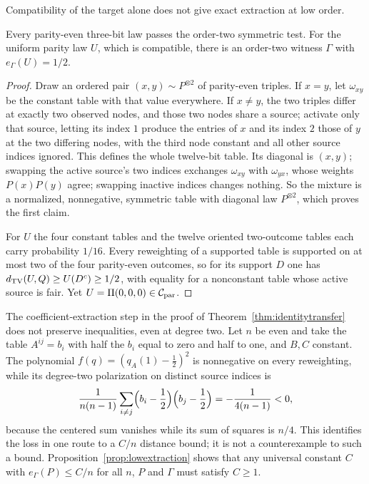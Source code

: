Compatibility of the target alone does not give exact extraction at low order.

\begin{proposition}\label{prop:lowextraction}
Every parity-even three-bit law passes the order-two symmetric test. For the uniform parity law $U$, which is compatible, there is an order-two witness $\Gamma$ with $e_\Gamma(U)=1/2$.
\end{proposition}

\begin{proof}
Draw an ordered pair $(x,y)\sim P^{\otimes2}$ of parity-even triples. If $x=y$, let $\omega_{xy}$ be the constant table with that value everywhere. If $x\ne y$, the two triples differ at exactly two observed nodes, and those two nodes share a source; activate only that source, letting its index $1$ produce the entries of $x$ and its index $2$ those of $y$ at the two differing nodes, with the third node constant and all other source indices ignored. This defines the whole twelve-bit table. Its diagonal is $(x,y)$; swapping the active source's two indices exchanges $\omega_{xy}$ with $\omega_{yx}$, whose weights $P(x)P(y)$ agree; swapping inactive indices changes nothing. So the mixture is a normalized, nonnegative, symmetric table with diagonal law $P^{\otimes2}$, which proves the first claim.

For $U$ the four constant tables and the twelve oriented two-outcome tables each carry probability $1/16$. Every reweighting of a supported table is supported on at most two of the four parity-even outcomes, so for its support $D$ one has $d_{\operatorname{TV}}(U,Q)\ge U(D^c)\ge1/2$, with equality for a nonconstant table whose active source is fair. Yet $U=\Pi(0,0,0)\in\mathcal C_{\mathrm{par}}$.
\end{proof}

The coefficient-extraction step in the proof of Theorem~\ref{thm:identitytransfer} does not preserve inequalities, even at degree two. Let $n$ be even and take the table $A^{ij}=b_i$ with half the $b_i$ equal to zero and half to one, and $B,C$ constant. The polynomial $f(q)=(q_A(1)-\tfrac12)^2$ is nonnegative on every reweighting, while its degree-two polarization on distinct source indices is
\[
\frac1{n(n-1)}\sum_{i\ne j}\Bigl(b_i-\frac12\Bigr)\Bigl(b_j-\frac12\Bigr)=-\frac1{4(n-1)}<0,
\]
because the centered sum vanishes while its sum of squares is $n/4$. This identifies the loss in one route to a $C/n$ distance bound; it is not a counterexample to such a bound. Proposition~\ref{prop:lowextraction} shows that any universal constant $C$ with $e_\Gamma(P)\le C/n$ for all $n$, $P$ and $\Gamma$ must satisfy $C\ge1$.
